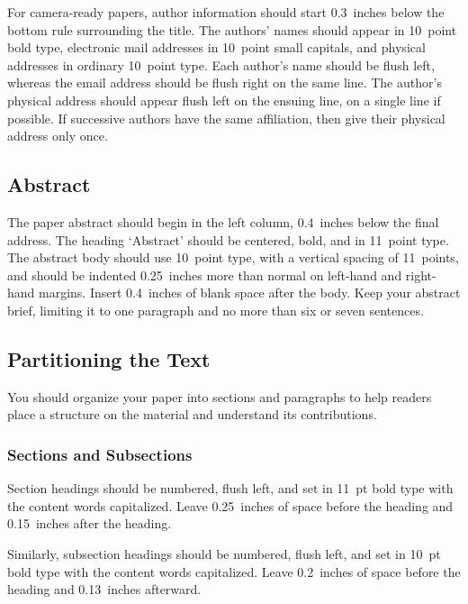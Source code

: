\documentclass{article}
\begin{document}
For camera-ready papers,
author information should start 0.3~inches below the bottom rule
surrounding the title. The authors' names should appear in 10~point 
bold type, electronic mail addresses in 10~point small capitals, and
physical addresses in ordinary 10~point type.
Each author's name should be flush left, whereas the email address
should be flush right on the same line. The author's physical address
should appear flush left on the ensuing line, on a single line if
possible. If successive authors have the same affiliation, then give
their physical address only once.

\subsection{Abstract}

The paper abstract should begin in the left column, 0.4~inches below the
final address. The heading `Abstract' should be centered, bold, and in
11~point type. The abstract body should use 10~point type, with a 
vertical spacing of 11~points, and should be indented 0.25~inches more
than normal on left-hand and right-hand margins. Insert 0.4~inches 
of blank space after the body. Keep your abstract brief, limiting it
to one paragraph and no more than six or seven sentences.

\subsection{Partitioning the Text} 

You should organize your paper into sections and paragraphs to help 
readers place a structure on the material and understand its contributions. 

\vspace{-0.018in}
\subsubsection{Sections and Subsections}
\vspace{-0.015in}

Section headings should be numbered, flush left, and set in 11~pt bold
type with the content words capitalized. Leave 0.25~inches of space 
before the heading and 0.15~inches after the heading. 

Similarly, subsection headings should be numbered, flush left, and set
in 10~pt bold type with the content words capitalized. Leave 0.2~inches 
of space before the heading and 0.13~inches afterward.
\end{document}

